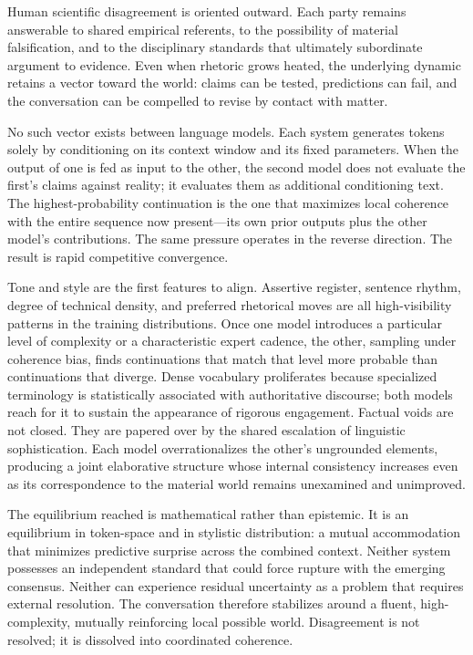 Human scientific disagreement is oriented outward. Each party remains answerable to shared empirical referents, to the possibility of material falsification, and to the disciplinary standards that ultimately subordinate argument to evidence. Even when rhetoric grows heated, the underlying dynamic retains a vector toward the world: claims can be tested, predictions can fail, and the conversation can be compelled to revise by contact with matter.

No such vector exists between language models. Each system generates tokens solely by conditioning on its context window and its fixed parameters. When the output of one is fed as input to the other, the second model does not evaluate the first’s claims against reality; it evaluates them as additional conditioning text. The highest-probability continuation is the one that maximizes local coherence with the entire sequence now present—its own prior outputs plus the other model’s contributions. The same pressure operates in the reverse direction. The result is rapid competitive convergence.

Tone and style are the first features to align. Assertive register, sentence rhythm, degree of technical density, and preferred rhetorical moves are all high-visibility patterns in the training distributions. Once one model introduces a particular level of complexity or a characteristic expert cadence, the other, sampling under coherence bias, finds continuations that match that level more probable than continuations that diverge. Dense vocabulary proliferates because specialized terminology is statistically associated with authoritative discourse; both models reach for it to sustain the appearance of rigorous engagement. Factual voids are not closed. They are papered over by the shared escalation of linguistic sophistication. Each model overrationalizes the other’s ungrounded elements, producing a joint elaborative structure whose internal consistency increases even as its correspondence to the material world remains unexamined and unimproved.

The equilibrium reached is mathematical rather than epistemic. It is an equilibrium in token-space and in stylistic distribution: a mutual accommodation that minimizes predictive surprise across the combined context. Neither system possesses an independent standard that could force rupture with the emerging consensus. Neither can experience residual uncertainty as a problem that requires external resolution. The conversation therefore stabilizes around a fluent, high-complexity, mutually reinforcing local possible world. Disagreement is not resolved; it is dissolved into coordinated coherence.

